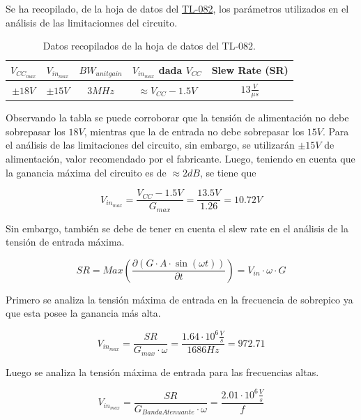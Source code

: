 Se ha recopilado, de la hoja de datos del \href{http://www.ti.com/lit/ds/symlink/tl082.pdf}{TL-082}, los parámetros utilizados en el análisis de las limitacionnes del circuito.

\begin{table}[H]
\centering
\begin{tabular}{@{}ccccc@{}}
\toprule
$V_{CC_{max}}$ & $V_{in_{max}}$ & $BW_{unitgain}$ & $V_{in_{max}}$ dada $V_{CC}$ & Slew Rate (SR)\\ \midrule
$\pm 18V$ & $\pm 15V$ & $3MHz$ & $\approx V_{CC}-1.5V$ & $13\frac{V}{\mu s}$\\ \bottomrule
\end{tabular}
\caption{Datos recopilados de la hoja de datos del TL-082.}
\label{tab:datos_tl082}
\end{table}

Observando la tabla se puede corroborar que la tensión de alimentación no debe sobrepasar los $18V$, mientras que la de entrada no debe sobrepasar los $15V$. Para el análisis de las limitaciones del circuito, sin embargo, se utilizarán $\pm 15V$ de alimentación, valor recomendado por el fabricante.
Luego, teniendo en cuenta que la ganancia máxima del circuito es de $\approx 2dB$, se tiene que

\begin{equation}
	V_{in_{max}} = \frac{V_{CC} - 1.5V}{G_{max}} = \frac{13.5V}{1.26} = 10.72V
\end{equation}

Sin embargo, también se debe de tener en cuenta el slew rate en el análisis de la tensión de entrada máxima.

\begin{equation}
	SR= Max\left( \frac{\partial (G\cdot A\cdot \sin (\omega t))}{\partial t}\right) = V_{in} \cdot \omega \cdot G  
\end{equation}

Primero se analiza la tensión máxima de entrada en la frecuencia de sobrepico ya que esta posee la ganancia más alta.

\begin{equation}
	V_{in_{max}} = \frac{SR}{G_{max}\cdot \omega} = \frac{1.64\cdot 10^6\frac{V}{s}}{1686Hz} = 972.71
\end{equation}

Luego se analiza la tensión máxima de entrada para las frecuencias altas.

\begin{equation}
	V_{in_{max}} = \frac{SR}{G_{Banda Atenuante}\cdot \omega} = \frac{2.01\cdot 10^6\frac{V}{s}}{f}
\end{equation}

